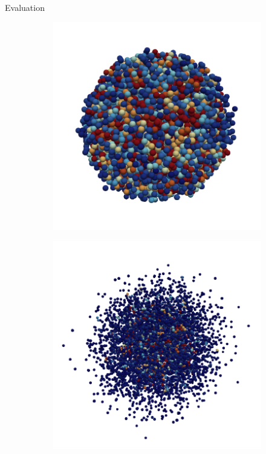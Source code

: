 \begin{frame}[c]{Evaluation}{}
{\begin{figure}[htpb]
\begin{subfigure}{.25\textwidth}
				\includegraphics[draft=false,width=\textwidth]{heating-sphere/render/t4000.png}
			\end{subfigure}%
			\begin{subfigure}{.25\textwidth}
				\includegraphics[draft=false,width=\textwidth]{heating-sphere/render/t23000.png}

\end{subfigure}
\end{figure}}
\end{frame}
